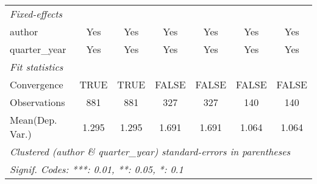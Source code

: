 \begin{tabular}{lcccccc}
   \midrule
   \emph{Fixed-effects}\\
   author                                & Yes          & Yes          & Yes          & Yes          & Yes        & Yes\\  
   quarter\_year                         & Yes          & Yes          & Yes          & Yes          & Yes        & Yes\\  
   \midrule
   \emph{Fit statistics}\\
   Convergence                           &TRUE          & TRUE         & FALSE        & FALSE        & FALSE      & FALSE\\  
   Observations                          & 881          & 881          & 327          & 327          & 140        & 140\\  
Mean(Dep. Var.) & 1.295 & 1.295 & 1.691 & 1.691 & 1.064 & 1.064 \\
   \midrule \midrule
   \multicolumn{7}{l}{\emph{Clustered (author \& quarter\_year) standard-errors in parentheses}}\\
   \multicolumn{7}{l}{\emph{Signif. Codes: ***: 0.01, **: 0.05, *: 0.1}}\\
\end{tabular}
\par\endgroup
